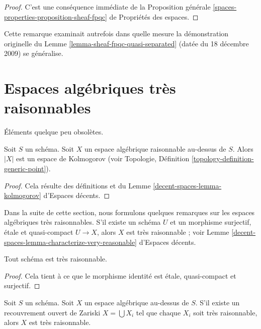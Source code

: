 \begin{proof}
C'est une cons\'equence imm\'ediate de la Proposition g\'en\'erale
\ref{spaces-properties-proposition-sheaf-fpqc}
de Propri\'et\'es des espaces.
\end{proof}

\begin{remark}
\label{remark-proof-works-when}
Cette remarque examinait autrefois dans quelle mesure la d\'emonstration originelle du
Lemme \ref{lemma-sheaf-fpqc-quasi-separated} (dat\'ee du 18 d\'ecembre 2009)
se g\'en\'eralise.
\end{remark}





\section{Espaces algébriques très raisonnables}
\label{section-very-reasonable}

\noindent
Éléments quelque peu obsolètes.

\begin{lemma}
\label{lemma-reasonable-kolmogorov}
Soit $S$ un schéma.
Soit $X$ un espace algébrique raisonnable au-dessus de $S$.
Alors $|X|$ est un espace de Kolmogorov (voir
Topologie, Définition \ref{topology-definition-generic-point}).
\end{lemma}

\begin{proof}
Cela résulte des définitions et du
Lemme \ref{decent-spaces-lemma-kolmogorov} d'Espaces décents.
\end{proof}

\noindent
Dans la suite de cette section, nous formulons quelques remarques sur les
espaces algébriques très raisonnables. S'il existe un schéma $U$ et un
morphisme surjectif, étale et quasi-compact
$U \to X$, alors $X$ est très raisonnable ; voir
Lemme \ref{decent-spaces-lemma-characterize-very-reasonable} d'Espaces décents.

\begin{lemma}
\label{lemma-scheme-very-reasonable}
Tout schéma est très raisonnable.
\end{lemma}

\begin{proof}
Cela tient à ce que le morphisme identité est étale, quasi-compact
et surjectif.
\end{proof}

\begin{lemma}
\label{lemma-very-reasonable-Zariski-local}
Soit $S$ un schéma.
Soit $X$ un espace algébrique au-dessus de $S$.
S'il existe un recouvrement ouvert de Zariski $X = \bigcup X_i$ tel que
chaque $X_i$ soit très raisonnable, alors $X$ est très raisonnable.
\end{lemma}

